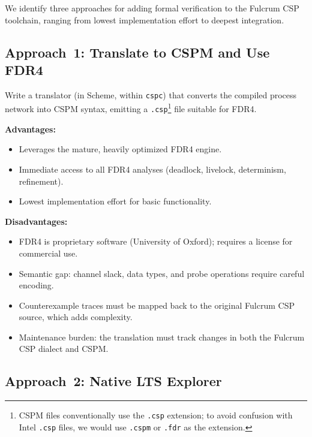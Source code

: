 \documentclass[11pt]{article}
\begin{document}
We identify three approaches for adding formal verification to the
Fulcrum CSP toolchain, ranging from lowest implementation effort to
deepest integration.

\subsection{Approach~1: Translate to CSPM and Use FDR4}

Write a translator (in Scheme, within \texttt{cspc}) that converts
the compiled process network into CSPM syntax, emitting a
\texttt{.csp}\footnote{CSPM files conventionally use the \texttt{.csp}
extension; to avoid confusion with Intel \texttt{.csp} files, we would
use \texttt{.cspm} or \texttt{.fdr} as the extension.} file suitable
for FDR4.

\textbf{Advantages:}
\begin{itemize}
\item Leverages the mature, heavily optimized FDR4 engine.
\item Immediate access to all FDR4 analyses (deadlock, livelock,
  determinism, refinement).
\item Lowest implementation effort for basic functionality.
\end{itemize}

\textbf{Disadvantages:}
\begin{itemize}
\item FDR4 is proprietary software (University of Oxford); requires
  a license for commercial use.
\item Semantic gap: channel slack, data types, and probe operations
  require careful encoding.
\item Counterexample traces must be mapped back to the original
  Fulcrum CSP source, which adds complexity.
\item Maintenance burden: the translation must track changes in both
  the Fulcrum CSP dialect and CSPM.
\end{itemize}

\subsection{Approach~2: Native LTS Explorer}
\end{document}
